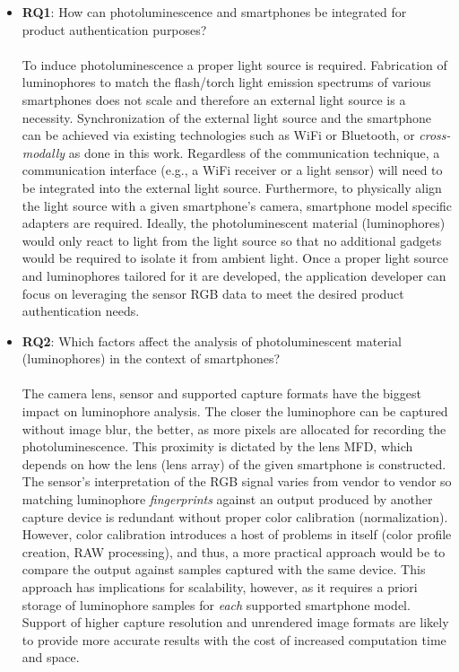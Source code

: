 \documentclass[thesis.tex]{subfiles}
\begin{document}
\begin{itemize}[label=, leftmargin=*]
  \item \textbf{RQ1}: How can photoluminescence and smartphones be integrated for product authentication purposes?\\\\
  To induce photoluminescence a proper light source is required. Fabrication of luminophores to match the flash/torch light emission spectrums of various smartphones does not scale and therefore an external light source is a necessity. Synchronization of the external light source and the smartphone can be achieved via existing technologies such as WiFi or Bluetooth, or \emph{cross-modally} as done in this work. Regardless of the communication technique, a communication interface (e.g., a WiFi receiver or a light sensor) will need to be integrated into the external light source. Furthermore, to physically align the light source with a given smartphone's camera, smartphone model specific adapters are required. Ideally, the photoluminescent material (luminophores) would only react to light from the light source so that no additional gadgets would be required to isolate it from ambient light. Once a proper light source and luminophores tailored for it are developed, the application developer can focus on leveraging the sensor RGB data to meet the desired product authentication needs.

  \item \textbf{RQ2}: Which factors affect the analysis of photoluminescent material (luminophores) in the context of smartphones?\\\\
  The camera lens, sensor and supported capture formats have the biggest impact on luminophore analysis. The closer the luminophore can be captured without image blur, the better, as more pixels are allocated for recording the photoluminescence. This proximity is dictated by the lens MFD, which depends on how the lens (lens array) of the given smartphone is constructed. The sensor's interpretation of the RGB signal varies from vendor to vendor so matching luminophore \emph{fingerprints} against an output produced by another capture device is redundant without proper color calibration (normalization). However, color calibration introduces a host of problems in itself (color profile creation, RAW processing), and thus, a more practical approach would be to compare the output against samples captured with the same device. This approach has implications for scalability, however, as it requires a priori storage of luminophore samples for \emph{each} supported smartphone model. Support of higher capture resolution and unrendered image formats are likely to provide more accurate results with the cost of increased computation time and space.


\end{itemize}
\end{document}
